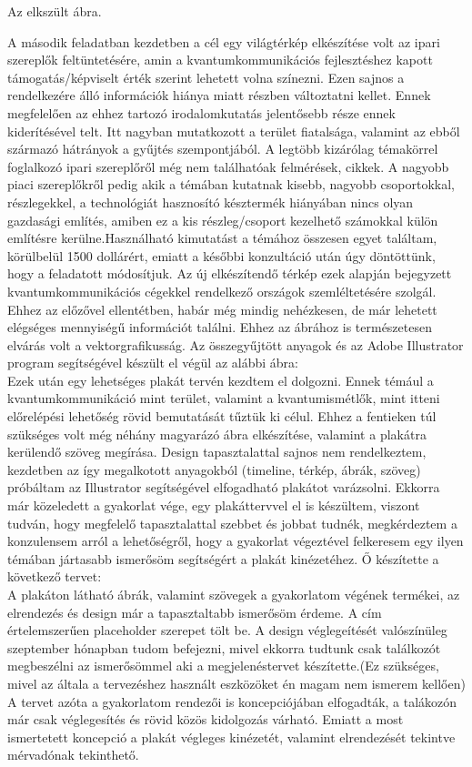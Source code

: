 Az elkszült ábra.

A második feladatban kezdetben a cél egy világtérkép elkészítése volt az ipari szereplők feltüntetésére, amin a kvantumkommunikációs fejlesztéshez kapott támogatás/képviselt érték szerint lehetett volna színezni. Ezen sajnos a rendelkezére álló információk hiánya miatt részben változtatni kellet. Ennek megfelelően az ehhez tartozó irodalomkutatás jelentősebb része ennek kiderítésével telt. Itt nagyban mutatkozott a terület fiatalsága, valamint az ebből származó hátrányok a gyűjtés szempontjából. A legtöbb kizárólag témakörrel foglalkozó ipari szereplőről még nem találhatóak felmérések, cikkek. A nagyobb piaci szereplőkről pedig akik a témában kutatnak kisebb, nagyobb csoportokkal, részlegekkel, a technológiát hasznosító késztermék hiányában nincs olyan gazdasági említés, amiben ez a kis részleg/csoport kezelhető számokkal külön említésre kerülne.Használható kimutatást a témához összesen egyet találtam, körülbelül 1500 dollárért, emiatt a későbbi konzultáció után úgy döntöttünk, hogy a feladatott módosítjuk. Az új elkészítendő térkép ezek alapján bejegyzett kvantumkommunikációs cégekkel rendelkező országok szemléltetésére szolgál. Ehhez az előzővel ellentétben, habár még mindig nehézkesen, de már lehetett elégséges mennyiségű információt találni. Ehhez az ábrához is természetesen elvárás volt a vektorgrafikusság. Az összegyűjtött anyagok és az Adobe Illustrator program segítségével készült el végül az alábbi ábra:\\

Ezek után egy lehetséges plakát tervén kezdtem el dolgozni. Ennek témául a kvantumkommunikáció mint terület, valamint a kvantumismétlők, mint itteni előrelépési lehetőség rövid bemutatását tűztük ki célul. Ehhez a fentieken túl szükséges volt még néhány magyarázó ábra elkészítése, valamint a plakátra kerülendő szöveg megírása. Design tapasztalattal sajnos nem rendelkeztem,  kezdetben az így megalkotott anyagokból (timeline, térkép, ábrák, szöveg) próbáltam az Illustrator segítségével elfogadható plakátot varázsolni. Ekkorra már közeledett a gyakorlat vége, egy plakáttervvel el is készültem, viszont tudván, hogy megfelelő tapasztalattal szebbet és jobbat tudnék, megkérdeztem a konzulensem arról a lehetőségről, hogy a gyakorlat végeztével felkeresem egy ilyen témában jártasabb ismerősöm segítségért a plakát kinézetéhez. Ő készítette a következő tervet:\\

A plakáton látható ábrák, valamint szövegek a gyakorlatom végének termékei, az elrendezés és design már a tapasztaltabb ismerősöm érdeme. A cím értelemszerűen placeholder szerepet tölt be. A design véglegeítését valószínüleg szeptember hónapban tudom befejezni, mivel ekkorra tudtunk csak találkozót megbeszélni az ismerősömmel aki a megjelenéstervet készítette.(Ez szükséges, mivel az általa a tervezéshez használt eszközöket én magam nem ismerem kellően) A tervet azóta a gyakorlatom rendezői is koncepciójában elfogadták, a talákozón már csak véglegesítés és rövid közös kidolgozás várható. Emiatt a most ismertetett koncepció a plakát végleges kinézetét, valamint elrendezését tekintve mérvadónak tekinthető.\\
